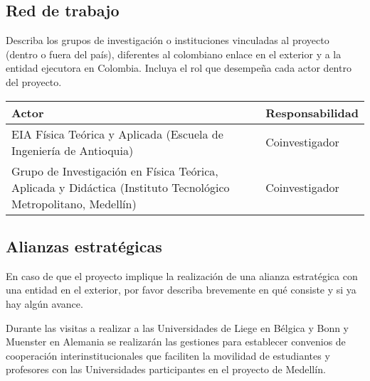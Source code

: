 \subsection{Red de trabajo}
\begin{instrucciones}
  Describa los grupos de investigación o instituciones vinculadas al
  proyecto (dentro o fuera del país), diferentes al colombiano enlace
  en el exterior y a la entidad ejecutora en Colombia. Incluya el rol
  que desempeña cada actor dentro del proyecto.
\end{instrucciones}

\begin{tabular}{|p{6cm}|l|}\hline
Actor & Responsabilidad\\\hline  
EIA Física Teórica y Aplicada 
(Escuela de Ingeniería de Antioquia)& Coinvestigador\\\hline
Grupo de Investigación en Física Teórica, Aplicada y Didáctica
(Instituto Tecnológico Metropolitano, Medellín)&Coinvestigador \\\hline
\end{tabular}

\subsection{Alianzas estratégicas}
\begin{instrucciones}
  En caso de que el proyecto implique la realización de una alianza
  estratégica con una entidad en el exterior, por favor describa
  brevemente en qué consiste y si ya hay algún avance.
\end{instrucciones}
Durante las visitas a realizar a las Universidades de Liege en
Bélgica y Bonn y Muenster en Alemania se realizarán las gestiones para
establecer convenios de cooperación interinstitucionales que faciliten
la movilidad de estudiantes y profesores con las Universidades
participantes en el proyecto de Medellín.
